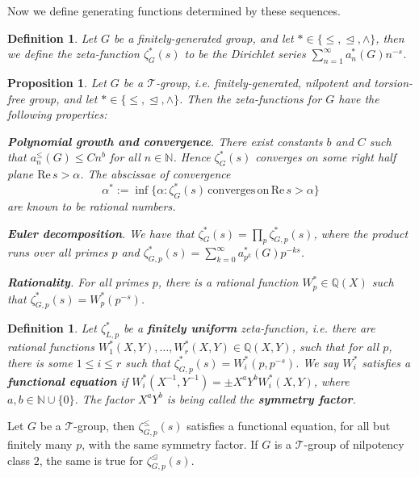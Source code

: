 \documentclass[12pt]{article}
\newtheorem{proposition}[theorem]{Proposition}
\newtheorem{definition}[theorem]{Definition}
\begin{document}
Now we define generating functions determined by these sequences. 
\begin{definition}
\label{def:zeta.function}
Let $G$ be a finitely-generated group, and let $\ast\in\{\leq,\trianglelefteq,\wedge\}$, then we define the zeta-function $\zeta_{G}^{\ast}(s)$ to be the Dirichlet series $\sum_{n=1}^{\infty}a_{n}^{\ast}(G){n}^{-s}$. 
\end{definition}
\begin{proposition}
Let $G$ be a $\mathcal{T}$-group, i.e. finitely-generated, nilpotent and torsion-free group, and let $\ast\in\{\leq,\trianglelefteq,\wedge\}$. Then the zeta-functions for $G$ have the following properties:\par
\textbf{Polynomial growth and convergence}. There exist constants $b$ and $C$ such that $a_{n}^{\leq}(G)\leq{C}{n}^{b}$ for all $n\in\mathbb{N}$. Hence $\zeta_{G}^{\ast}(s)$ converges on some right half plane $\mathrm{Re}\,s>\alpha$. The abscissae of convergence \[\alpha^{\ast}:=\inf\{\alpha : \zeta_{G}^{\ast}(s)\,\mathrm{converges}\,\mathrm{on}\,\mathrm{Re}\,s>\alpha\}\] are known to be rational numbers.

\textbf{Euler decomposition}.
We have that $\zeta_{G}^{\ast}(s)=\prod_{p}\zeta_{G,p}^{\ast}(s)$, where the product runs over all primes $p$ and $\zeta_{G,p}^{\ast}(s)=\sum_{k=0}^{\infty}a_{p^k}^{\ast}(G)p^{-ks}$.

\textbf{Rationality}. For all primes $p$, there is a rational function $W_{p}^{\ast}\in\mathbb{Q}(X)$ such that $\zeta_{G,p}^{\ast}(s)=W_{p}^{\ast}(p^{-s})$.
\end{proposition}
\begin{definition}
Let $\zeta_{L,p}^{\ast}$ be a \textbf{finitely uniform} zeta-function, i.e. there are rational functions $W_{1}^{\ast}(X,Y),\dots,W_{r}^{\ast}(X,Y)\in\mathbb{Q}(X,Y)$, such that for all $p$, there is some $1\leq{i}\leq{r}$ such that $\zeta_{G,p}^{\ast}(s)=W_{i}^{\ast}(p,p^{-s})$. We say $W_{i}^{\ast}$ satisfies a \textbf{functional equation} if $W_{i}^{\ast}(X^{-1},Y^{-1})=\pm{X}^{a}{Y}^{b}{W_{i}^{\ast}(X,Y)}$, where $a,b\in\mathbb{N}\cup\{0\}$. The factor $X^{a}Y^{b}$ is being called the \textbf{symmetry factor}.    
\end{definition}
Let $G$ be a $\mathcal{T}$-group, then $\zeta_{G,p}^{\leq}(s)$ satisfies a functional equation, for all but finitely many $p$, with the same symmetry factor. If $G$ is a $\mathcal{T}$-group of nilpotency class $2$, the same is true for $\zeta_{G,p}^{\trianglelefteq}(s)$.
\end{document}
